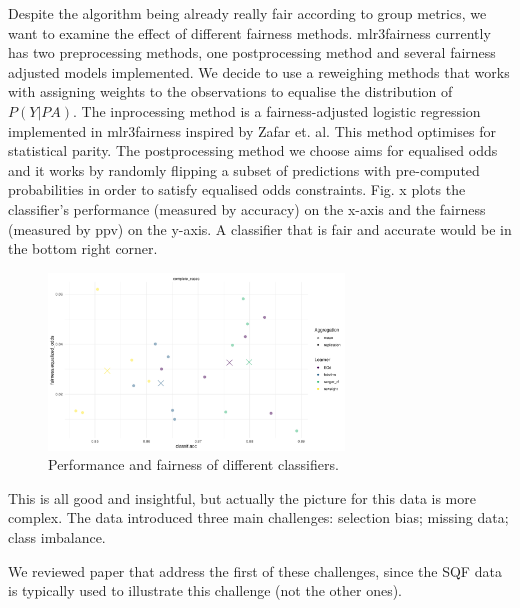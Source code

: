 Despite the algorithm being already really fair according to group metrics, we want to examine the effect of different fairness methods.
mlr3fairness currently has two preprocessing methods, one postprocessing method and several fairness adjusted models implemented. We decide to use a reweighing methods that works with assigning weights to the observations to equalise the distribution of $P(Y|PA)$.
The inprocessing method is a fairness-adjusted logistic regression implemented in mlr3fairness inspired by Zafar et. al. This method optimises for statistical parity. The postprocessing method we choose aims for equalised odds and it works by randomly flipping a subset of predictions with pre-computed probabilities in order to satisfy equalised odds constraints.
Fig. x plots the classifier's performance (measured by accuracy) on the x-axis and the fairness (measured by ppv) on the y-axis. A classifier that is fair and accurate would be in the bottom right corner.
\begin{figure}
    \centering
    \includegraphics[width=0.7\textwidth]{../figures/sqf_case_study_plot3.png}
    \caption{Performance and fairness of different classifiers.}
    \label{fig:fairness_performance}
\end{figure}


This is all good and insightful, but actually the picture for this data is more complex.
The data introduced three main challenges: selection bias; missing data; class imbalance.

We reviewed paper that address the first of these challenges, since the SQF data is typically used to illustrate this challenge (not the other ones).


